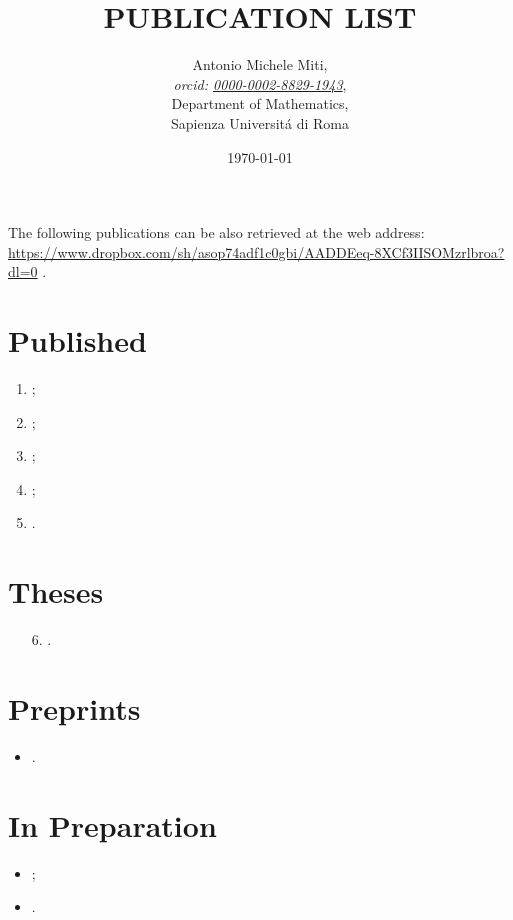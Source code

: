 \documentclass{article}
\title{PUBLICATION LIST}
\date{\today}
\author{
	Antonio Michele Miti,\\
	\emph{orcid: \href{https://orcid.org/0000-0002-8829-1943}{0000-0002-8829-1943}},
	\\
	Department of Mathematics,\\
	Sapienza Universit\'a di Roma
}
\begin{document}
  

	\maketitle

	\noindent
  The following publications can be also retrieved at the web address:
  \\ 
  \url{https://www.dropbox.com/sh/asop74adf1c0gbi/AADDEeq-8XCf3IISOMzrlbroa?dl=0}
  .


  \section*{Published}
	  \begin{enumerate}
 	   \item {};	  
	   \item {};		
 	   \item {};
 	   \item {};
 	   \item {}.
	  \end{enumerate}

  \section*{Theses}
	  \begin{itemize}
 	   \item[6.] .
	  \end{itemize}




  \section*{Preprints}
	  \begin{itemize}
    	   \item {}.
	  \end{itemize}
  
  \section*{In Preparation}
	  \begin{itemize}
    	\item {};
    	\item {}.
	  \end{itemize}

  
\end{document}
